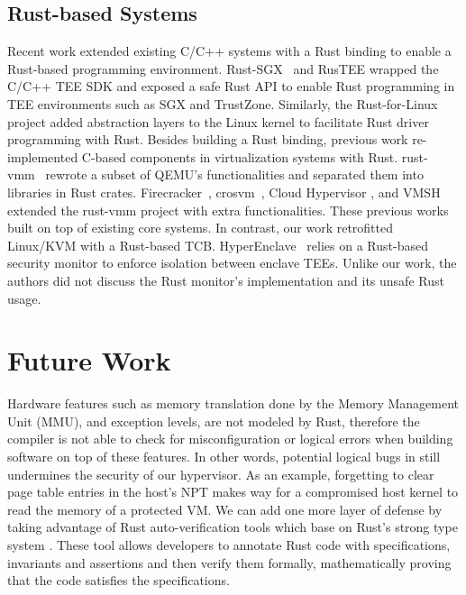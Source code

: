 \subsection{Rust-based Systems}
Recent work extended existing C/C++ systems with a Rust binding to enable
a Rust-based programming environment. Rust-SGX~\cite{rustsgx} and RusTEE
\cite{rustee} wrapped the C/C++ TEE SDK and exposed a safe Rust API
to enable Rust programming in TEE environments such as SGX and TrustZone.
Similarly, the Rust-for-Linux~\cite{Rust-for-Linux} project added
abstraction layers to the Linux kernel to facilitate Rust driver
programming with Rust.
Besides building a Rust binding, previous work re-implemented C-based
components in virtualization systems with Rust.
rust-vmm~\cite{rust-vmm} rewrote a subset of QEMU's functionalities
and separated them into libraries in Rust crates.
Firecracker~\cite{Firecracker}, crosvm~\cite{crosvm}, Cloud Hypervisor
\cite{CloudHypervisor}, and VMSH~\cite{VMSH} extended the
rust-vmm project with extra functionalities. These previous works
built on top of existing core systems. In contrast, our work
retrofitted Linux/KVM with a Rust-based TCB.
HyperEnclave~\cite{hyperenclave} relies on a Rust-based security
monitor to enforce isolation between enclave TEEs. Unlike
our work, the authors did not discuss the Rust monitor's implementation
and its unsafe Rust usage.

\section{Future Work}

Hardware features such as memory translation done by the Memory Management
Unit (MMU), and exception levels, are not modeled by Rust, therefore the
compiler is not able to check for misconfiguration or logical errors when
building software on top of these features.
In other words, potential logical bugs in \rustcore{} still undermines the
security of our hypervisor.
As an example, forgetting to clear page table entries in the host's NPT
makes way for a compromised host kernel to read the memory of a protected VM.
We can add one more layer of defense by taking advantage of Rust
auto-verification tools which base on Rust's strong type system
\cite{Verus, Prusti, Creusot, Flux}. These tool allows developers to annotate
Rust code with specifications, invariants and assertions and then verify them
formally, mathematically proving that the code satisfies the specifications.

